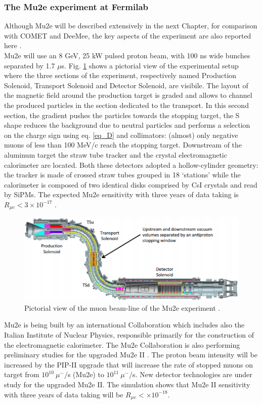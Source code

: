 \documentclass[12pt,a4paper,openright, oneside, titlepage]{book} %
\begin{document}
\subsubsection{The Mu2e experiment at Fermilab}
Although Mu2e will be described extensively in the next Chapter, for comparison with COMET and DeeMee, the key aspects of the experiment are also reported here \cite{bob_mu2e}\cite{Manolis}.\\
Mu2e will use an 8 GeV, 25 kW pulsed proton beam, with 100 ns wide bunches separated by 1.7 $\mu$s.  
Fig. \ref{_MuonBeamline} shows a pictorial view of the experimental setup where the three sections of the experiment, respectively named Production Solenoid, Transport Solenoid and Detector Solenoid, are visibile.  
The layout of the magnetic field around the production target is graded and allows to channel the produced particles in the section dedicated to the transport. 
In this second section, the gradient pushes the particles towards the stopping target, the S shape reduces the background due to neutral particles and performs a selection on the charge sign using eq. \ref{eq_D} and collimators: (almost) only negative muons of less than 100 MeV/c reach the stopping target. 
Downstream of the aluminum target the straw tube tracker and the crystal electromagnetic calorimeter are located. 
Both these detectors adopted a hollow-cylinder geometry: the tracker is made of crossed straw tubes grouped in 18 `stations' while the calorimeter is composed of two identical disks comprised by CsI crystals and read by SiPMs.
The expected Mu2e sensitivity with three years of data taking is $R_{\mu e}<3\times10^{-17}$ \cite{MTDR}.

\begin{figure}[h!]
\centering
\includegraphics[scale=0.8]{MuonBeamline}
\caption[Mu2e experiment]{Pictorial view of the muon beam-line of the Mu2e experiment \cite{MTDR}.}
\label{_MuonBeamline}
\end{figure}

\noindent
Mu2e is being built by an international Collaboration which includes also the Italian Institute of Nuclear Physics, responsible primarily for the construction of the electromagnetic calorimeter.
The Mu2e Collaboration is also performing preliminary studies for the upgraded Mu2e II \cite{Mu2e_II:2018}. 
The proton beam intensity will be increased by the PIP-II upgrade \cite{PIP_II:2018} that will increase the rate of stopped muons on target from $10^{10}\ \mu^-/$s (Mu2e) to $10^{11}\ \mu^-/$s. 
New detector technologies are under study for the upgraded Mu2e II.
The simulation shows that Mu2e II sensitivity with three years of data taking will be $R_{\mu e} < \times10^{-18}$.
\end{document}
